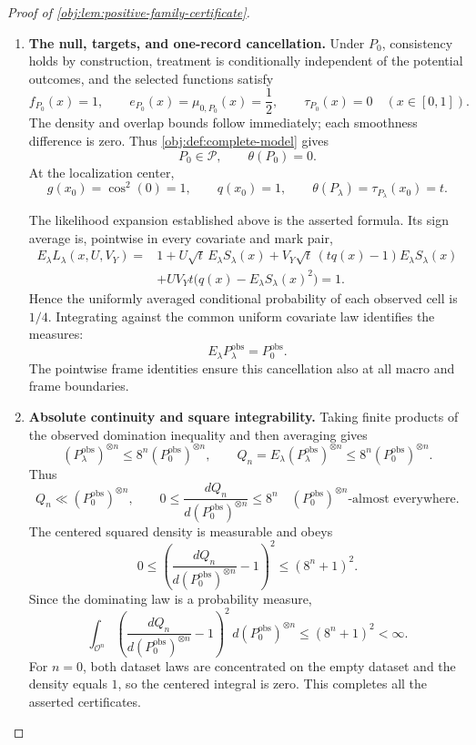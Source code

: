 \documentclass[11pt]{article}
\begin{document}
\begin{proof}[Proof of \cref{obj:lem:positive-family-certificate}]
\begin{enumerate}
\item \textbf{The null, targets, and one-record cancellation.}
Under \(P_0\), consistency holds by construction, treatment is
conditionally independent of the potential outcomes, and the selected
functions satisfy
\[
f_{P_0}(x)=1,\qquad
e_{P_0}(x)=\mu_{0,P_0}(x)=\frac12,\qquad
\tau_{P_0}(x)=0
\quad(x\in[0,1]).
\]
The density and overlap bounds follow immediately; each smoothness
difference is zero. Thus \cref{obj:def:complete-model} gives
\[
P_0\in\mathcal P,\qquad \theta(P_0)=0.
\]
At the localization center,
\[
g(x_0)=\cos^2(0)=1,\qquad q(x_0)=1,
\qquad
\theta(P_\lambda)=\tau_{P_\lambda}(x_0)=t.
\]

The likelihood expansion established above is the asserted formula.
Its sign average is, pointwise in every covariate and mark pair,
\[
\begin{aligned}
E_\lambda L_\lambda(x,U,V_Y)
={}&1+U\sqrt t\,E_\lambda S_\lambda(x)
 +V_Y\sqrt t\,(tq(x)-1)E_\lambda S_\lambda(x)\\
&+UV_Yt\bigl(q(x)-E_\lambda S_\lambda(x)^2\bigr)
=1.
\end{aligned}
\]
Hence the uniformly averaged conditional probability of each observed
cell is \(1/4\). Integrating against the common uniform covariate law
identifies the measures:
\[
E_\lambda P_\lambda^{\mathrm{obs}}=P_0^{\mathrm{obs}}.
\]
The pointwise frame identities ensure this cancellation also at all
macro and frame boundaries.

\item \textbf{Absolute continuity and square integrability.}
Taking finite products of the observed domination inequality and
then averaging gives
\[
(P_\lambda^{\mathrm{obs}})^{\otimes n}
\le8^n(P_0^{\mathrm{obs}})^{\otimes n},
\qquad
Q_n=E_\lambda(P_\lambda^{\mathrm{obs}})^{\otimes n}
\le8^n(P_0^{\mathrm{obs}})^{\otimes n}.
\]
Thus
\[
Q_n\ll(P_0^{\mathrm{obs}})^{\otimes n},
\qquad
0\le\frac{dQ_n}{d(P_0^{\mathrm{obs}})^{\otimes n}}
\le8^n
\quad (P_0^{\mathrm{obs}})^{\otimes n}\text{-almost everywhere}.
\]
The centered squared density is measurable and obeys
\[
0\le
\left(\frac{dQ_n}{d(P_0^{\mathrm{obs}})^{\otimes n}}-1\right)^2
\le(8^n+1)^2.
\]
Since the dominating law is a probability measure,
\[
\int_{\mathcal O^n}
\left(\frac{dQ_n}{d(P_0^{\mathrm{obs}})^{\otimes n}}-1\right)^2
\,d(P_0^{\mathrm{obs}})^{\otimes n}
\le(8^n+1)^2<\infty.
\]
For \(n=0\), both dataset laws are concentrated on the empty dataset
and the density equals \(1\), so the centered integral is zero.
This completes all the asserted certificates.
\end{enumerate}
\end{proof}
\end{document}
